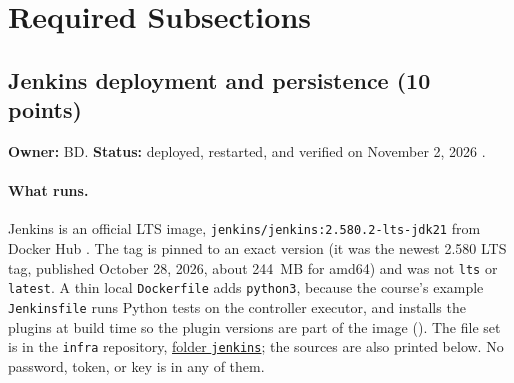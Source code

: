 \section{Required Subsections}
\subsection{Jenkins deployment and persistence (10 points)}
\label{Section:jenkDeployment}
\textbf{Owner:} BD. \textbf{Status:} deployed, restarted, and verified on November 2, 2026 \StatusPass.

\paragraph{What runs.} Jenkins is an official LTS image, \texttt{jenkins/jenkins:2.580.2-lts-jdk21} from
Docker Hub \cite{JenkinsDocker}. The tag is pinned to an exact version (it was the newest 2.580 LTS tag,
published October 28, 2026, about 244~MB for amd64) and was not \texttt{lts} or \texttt{latest}. A thin
local \texttt{Dockerfile} adds \texttt{python3}, because the course's example \texttt{Jenkinsfile} runs
Python tests on the controller executor, and installs the plugins at build time so the plugin versions are
part of the image (). The file set is in the \texttt{infra} repository,
\href{\GiteaURL/group1-startup/infra/src/branch/main/jenkins}{folder \texttt{jenkins}}; the sources are also printed
below. No password, token, or key is in any of them.

\begin{longlisting}
\inputminted[fontsize=\scriptsize]{docker}{config/jenkins/Dockerfile}
\caption{\texttt{Dockerfile} of the Jenkins image: official LTS image, \texttt{python3}, and four plugins (their dependencies are resolved at build time).}
\label{Listing:JenkinsDockerfile}
\end{longlisting}

\begin{longlisting}
\inputminted[fontsize=\scriptsize]{yaml}{config/jenkins/docker-compose.yml}
\caption{Compose file: no \texttt{ports:} on purpose, a 640~MiB memory limit, a 384~MB Java heap, a named volume, and the Docker network that Gitea and Caddy already share.}
\label{Listing:JenkinsCompose}
\end{longlisting}

